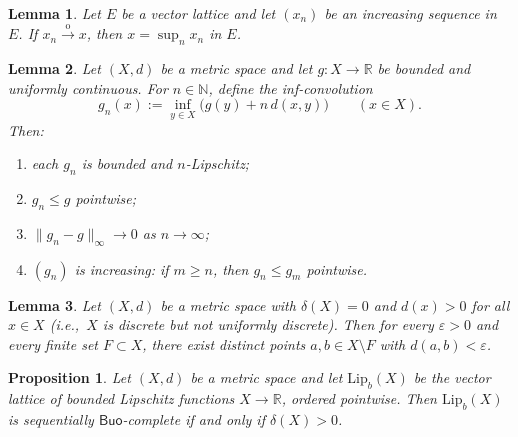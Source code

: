 \documentclass[10pt,a4paper]{amsart}
\newtheorem{proposition}{Proposition}
\newtheorem{lemma}{Lemma}
\newcommand{\Buo}{\ensuremath{\mathsf{Buo}}}
\newcommand{\N}{\mathbb{N}}
\newcommand{\R}{\mathbb{R}}
\renewcommand{\ge}{\geqslant}
\renewcommand{\le}{\leqslant}
\begin{document}
\begin{lemma}\label{lem:monotone_order_limit}
Let $E$ be a vector lattice and let $(x_n)$ be an increasing sequence in $E$.
If $x_n\xrightarrow{\mathrm{o}}x$, then $x=\sup_n x_n$ in $E$.
\end{lemma}

\begin{lemma}\label{lem:UC-approx-by-Lip}
Let $(X,d)$ be a metric space and let $g:X\to\R$ be bounded and uniformly continuous.
For $n\in\N$, define the \emph{inf-convolution}
\[
g_n(x):=\inf_{y\in X}\bigl(g(y)+n\,d(x,y)\bigr)\qquad(x\in X).
\]
Then:
\begin{enumerate}[\upshape(i)]
\item each $g_n$ is bounded and $n$-Lipschitz;
\item $g_n\le g$ pointwise;
\item $\|g_n-g\|_\infty\to0$ as $n\to\infty$;
\item $(g_n)$ is increasing: if $m\ge n$, then $g_n\le g_m$ pointwise.
\end{enumerate}
\end{lemma}

\begin{lemma}\label{lem:many-close-pairs}
Let $(X,d)$ be a metric space with $\delta(X)=0$ and $d(x)>0$ for all $x\in X$
(i.e.,\ $X$ is discrete but not uniformly discrete). Then for every $\varepsilon>0$
and every finite set $F\subset X$, there exist distinct points $a,b\in X\setminus F$
with $d(a,b)<\varepsilon$.
\end{lemma}

\begin{proposition}\label{prop:Lipb-uniformly-discrete}
Let $(X,d)$ be a metric space and let $\mathrm{Lip}_b(X)$ be the vector lattice of bounded
Lipschitz functions $X\to\R$, ordered pointwise. Then $\mathrm{Lip}_b(X)$ is sequentially
\Buo-complete if and only if $\delta(X)>0$.
\end{proposition}
\end{document}
